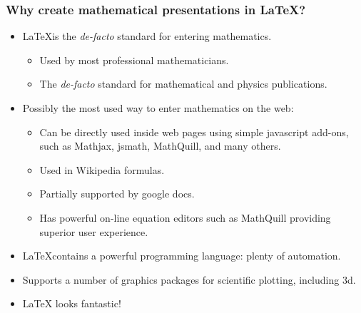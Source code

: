 \begin{frame}
\frametitle{Why create mathematical presentations in \LaTeX?}
\begin{itemize}
\item \LaTeX is the \emph{de-facto} standard for entering mathematics.
\begin{itemize}
\item Used by most professional mathematicians.
\item The \emph{de-facto} standard for mathematical and physics publications.
\end{itemize}
\item Possibly the most used way to enter mathematics on the web:
\begin{itemize}
\item Can be directly used inside web pages using simple javascript add-ons, such as Mathjax, jsmath, MathQuill, and many others.
\item Used in Wikipedia formulas. 
\item Partially supported by google docs.
\item Has powerful on-line equation editors such as MathQuill providing superior user experience.
\end{itemize}
\item \LaTeX contains a powerful programming language: plenty of automation.
\item Supports a number of graphics packages for scientific plotting, including 3d.
\item \LaTeX{} looks fantastic!

\end{itemize}

\end{frame}